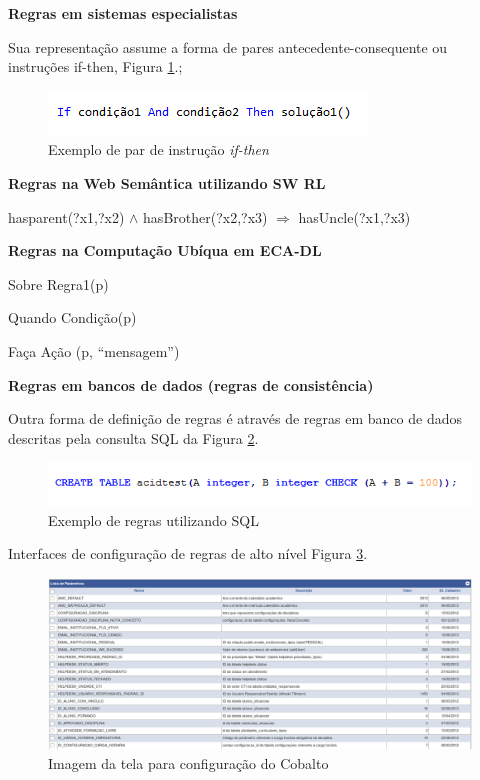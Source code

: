 \documentclass[12pt,a4paper,compsoc]{IEEEtran}
\begin{document}
  \textbf{Regras em sistemas especialistas}

  Sua representação assume a forma de pares antecedente-consequente ou instruções if-then, Figura
  \ref{if-then}.;

  \begin{figure}[ht]
    \centerline{\includegraphics[scale=1]{imagens/if_then}}
    \caption{Exemplo de par de instrução \textit{if-then}}
    \label{if-then}
  \end{figure}
  
  \textbf{Regras na Web Semântica utilizando SW RL}
  
  hasparent(?x1,?x2) $\wedge$ hasBrother(?x2,?x3) $\Rightarrow$ hasUncle(?x1,?x3)

  \textbf{Regras na Computação Ubíqua em ECA-DL}

  Sobre Regra1(p)
  
  Quando Condição(p)
  
  Faça Ação (p, ``mensagem'')


  \textbf{Regras em bancos de dados (regras de consistência)}
  
  Outra forma de definição de regras é através de regras em banco de dados descritas pela consulta SQL
  da Figura \ref{create-table}.
  
  \begin{figure}[ht]
    \centerline{\includegraphics[scale=.6]{imagens/acidtest}}
    \caption{Exemplo de regras utilizando SQL}
    \label{create-table}
  \end{figure}

  Interfaces de configuração de regras de alto nível  Figura \ref{config-cobalto}.

  \begin{figure}[!ht]
    \centerline{\includegraphics[width=.3\textwidth]{imagens/config-cobalto}}
    \caption{Imagem da tela para configuração do Cobalto}
    \label{config-cobalto}
  \end{figure}
\end{document}
